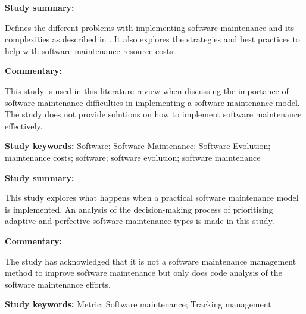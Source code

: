 \begin{tcolorbox}[colback=gray!5!white, colframe=deepblue!80!black, title=On the Relationship between Software Complexity and Maintenance Costs\cite{Ogheneovo2014}]
	\begin{minipage}[t]{0.25\textwidth}
		\textbf{Study summary:}
	\end{minipage}
	\hfill
	\begin{minipage}[t]{0.65\textwidth}
		Defines the different problems with implementing software maintenance and its complexities as described in . It also explores the strategies and best practices to help with software maintenance resource costs.
	\end{minipage}

	\vspace{0.75em} 

	\begin{minipage}[t]{0.25\textwidth}
		\textbf{Commentary:}
	\end{minipage}
	\hfill
	\begin{minipage}[t]{0.65\textwidth}
		This study is used in this literature review when discussing the importance of software maintenance difficulties in implementing a software maintenance model. The study does not provide solutions on how to implement software maintenance effectively.
	\end{minipage}
	\tcblower
	\textbf{Study keywords:} Software; Software Maintenance; Software Evolution; maintenance costs; software; software evolution; software maintenance
\end{tcolorbox}

\begin{tcolorbox}[colback=gray!5!white, colframe=deepblue!80!black, title=Metric-based tracking management in software maintenance\cite{Tang2010}]
	\begin{minipage}[t]{0.25\textwidth}
		\textbf{Study summary:}
	\end{minipage}
	\hfill
	\begin{minipage}[t]{0.65\textwidth}
		This study explores what happens when a practical software maintenance model is implemented. An analysis of the decision-making process of prioritising adaptive and perfective software maintenance types is made in this study.
	\end{minipage}

	\vspace{0.75em} 

	\begin{minipage}[t]{0.25\textwidth}
		\textbf{Commentary:}
	\end{minipage}
	\hfill
	\begin{minipage}[t]{0.65\textwidth}
		The study has acknowledged that it is not a software maintenance management method to improve software maintenance but only does code analysis of the software maintenance efforts.
	\end{minipage}
	\tcblower
	\textbf{Study keywords:} Metric; Software maintenance; Tracking management
\end{tcolorbox}

